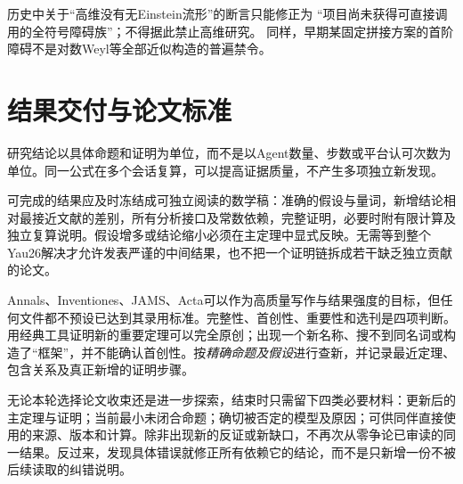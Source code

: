 \documentclass[UTF8,a4paper,11pt,fontset=fandol]{ctexart}
\numberwithin{equation}{section}
\theoremstyle{definition}
\begin{document}
历史中关于“高维没有无Einstein流形”的断言只能修正为
“项目尚未获得可直接调用的全符号障碍族”；不得据此禁止高维研究。
同样，早期某固定拼接方案的首阶障碍不是对数Weyl等全部近似构造的普遍禁令。

\section{结果交付与论文标准}
研究结论以具体命题和证明为单位，而不是以Agent数量、步数或平台认可次数为单位。同一公式在多个会话复算，可以提高证据质量，不产生多项独立新发现。

可完成的结果应及时冻结成可独立阅读的数学稿：准确的假设与量词，新增结论相对最接近文献的差别，所有分析接口及常数依赖，完整证明，必要时附有限计算及独立复算说明。假设增多或结论缩小必须在主定理中显式反映。无需等到整个Yau26解决才允许发表严谨的中间结果，也不把一个证明链拆成若干缺乏独立贡献的论文。

Annals、Inventiones、JAMS、Acta可以作为高质量写作与结果强度的目标，但任何文件都不预设已达到其录用标准。完整性、首创性、重要性和选刊是四项判断。用经典工具证明新的重要定理可以完全原创；出现一个新名称、搜不到同名词或构造了“框架”，并不能确认首创性。按\emph{精确命题及假设}进行查新，并记录最近定理、包含关系及真正新增的证明步骤。

无论本轮选择论文收束还是进一步探索，结束时只需留下四类必要材料：更新后的主定理与证明；当前最小未闭合命题；确切被否定的模型及原因；可供同伴直接使用的来源、版本和计算。除非出现新的反证或新缺口，不再次从零争论已审读的同一结果。反过来，发现具体错误就修正所有依赖它的结论，而不是只新增一份不被后续读取的纠错说明。
\end{document}
